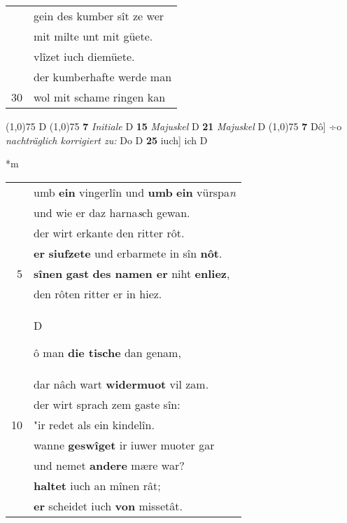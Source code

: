 \documentclass[8pt,a4paper,notitlepage]{article}
\begin{document}
\begin{table}[ht]
\begin{minipage}[t]{0.5\linewidth}
\begin{tabular}{rl}
 & gein des kumber sît ze wer\\ 
 & mit milte unt mit güete.\\ 
 & vlîzet iuch diemüete.\\ 
 & der kumberhafte werde man\\ 
30 & wol mit schame ringen kan\\ 
\end{tabular}
\scriptsize
\line(1,0){75} \newline
D \newline
\line(1,0){75} \newline
\textbf{7} \textit{Initiale} D  \textbf{15} \textit{Majuskel} D  \textbf{21} \textit{Majuskel} D  \newline
\line(1,0){75} \newline
\textbf{7} Dô] ÷o \textit{nachträglich korrigiert zu:} Do D \textbf{25} iuch] ich D \newline
\end{minipage}
\hspace{0.5cm}
\begin{minipage}[t]{0.5\linewidth}
\small
\begin{center}*m
\end{center}
\begin{tabular}{rl}
 & umb \textbf{ein} vingerlîn und \textbf{umb} \textbf{ein} vürspa\textit{n}\\ 
 & und wie er daz harna\textit{s}ch gewan.\\ 
 & der wirt erkante den ritter rôt.\\ 
 & \textbf{er} \textbf{siufzete} und erbarmete in sîn \textbf{nôt}.\\ 
5 & \textbf{sînen} \textbf{gast} \textbf{des namen er} niht \textbf{enliez},\\ 
 & den rôten ritter er in hiez.\\ 
 & \begin{large}D\end{large}ô man \textbf{die tische} dan genam,\\ 
 & dar nâch wart \textbf{widermuot} vil zam.\\ 
 & der wirt sprach zem gaste sîn:\\ 
10 & "ir redet als ein kindelîn.\\ 
 & wanne \textbf{geswîget} ir iuwer muoter gar\\ 
 & und nemet \textbf{andere} mære war?\\ 
 & \textbf{haltet} iuch an mînen rât;\\ 
 & \textbf{er} scheidet iuch \textbf{von} missetât.\\ 

\end{tabular}
\end{minipage}
\end{table}
\end{document}
